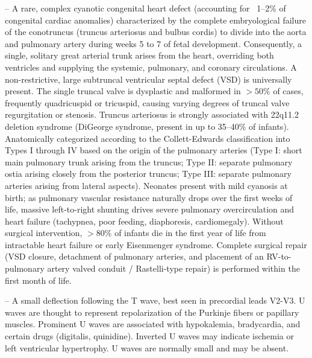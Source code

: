 -- A rare, complex cyanotic congenital heart defect (accounting for ~1--2\% of congenital cardiac anomalies) characterized by the complete embryological failure of the conotruncus (truncus arteriosus and bulbus cordis) to divide into the aorta and pulmonary artery during weeks 5 to 7 of fetal development. Consequently, a single, solitary great arterial trunk arises from the heart, overriding both ventricles and supplying the systemic, pulmonary, and coronary circulations. A non-restrictive, large subtruncal ventricular septal defect (VSD) is universally present. The single truncal valve is dysplastic and malformed in $>50\%$ of cases, frequently quadricuspid or tricuspid, causing varying degrees of truncal valve regurgitation or stenosis. Truncus arteriosus is strongly associated with 22q11.2 deletion syndrome (DiGeorge syndrome, present in up to 35--40\% of infants). Anatomically categorized according to the Collett-Edwards classification into Types I through IV based on the origin of the pulmonary arteries (Type I: short main pulmonary trunk arising from the truncus; Type II: separate pulmonary ostia arising closely from the posterior truncus; Type III: separate pulmonary arteries arising from lateral aspects). Neonates present with mild cyanosis at birth; as pulmonary vascular resistance naturally drops over the first weeks of life, massive left-to-right shunting drives severe pulmonary overcirculation and heart failure (tachypnea, poor feeding, diaphoresis, cardiomegaly). Without surgical intervention, $>80\%$ of infants die in the first year of life from intractable heart failure or early Eisenmenger syndrome. Complete surgical repair (VSD closure, detachment of pulmonary arteries, and placement of an RV-to-pulmonary artery valved conduit / Rastelli-type repair) is performed within the first month of life.

-- A small deflection following the T wave, best seen in precordial leads V2-V3. U waves are thought to represent repolarization of the Purkinje fibers or papillary muscles. Prominent U waves are associated with hypokalemia, bradycardia, and certain drugs (digitalis, quinidine). Inverted U waves may indicate ischemia or left ventricular hypertrophy. U waves are normally small and may be absent.

